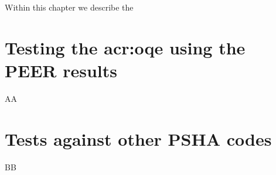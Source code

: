Within this chapter we describe the 
%
\section{Testing the \gls{acr:oqe} using the PEER results}
%
AA
%
\section{Tests against other PSHA codes}
BB
